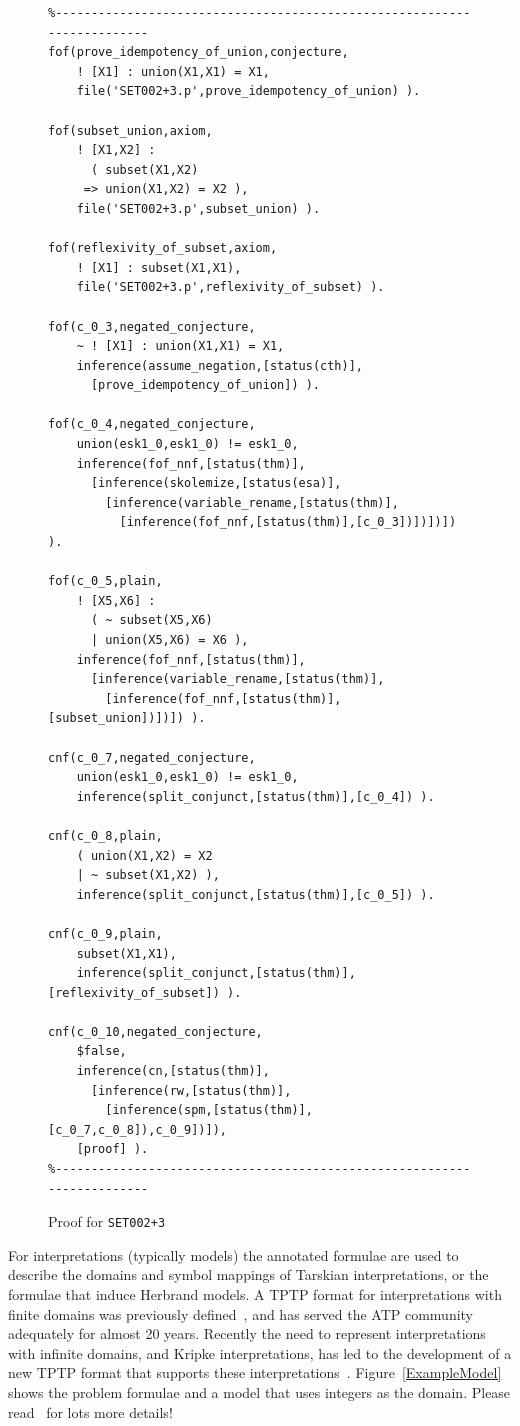 \documentclass[runningheads]{llncs}
\begin{document}
\begin{figure}[h!]
\centering
{\footnotesize
{\setlength{\baselineskip}{3mm}
\begin{verbatim}
%------------------------------------------------------------------------
fof(prove_idempotency_of_union,conjecture,
    ! [X1] : union(X1,X1) = X1,
    file('SET002+3.p',prove_idempotency_of_union) ).

fof(subset_union,axiom,
    ! [X1,X2] :
      ( subset(X1,X2)
     => union(X1,X2) = X2 ),
    file('SET002+3.p',subset_union) ).

fof(reflexivity_of_subset,axiom,
    ! [X1] : subset(X1,X1),
    file('SET002+3.p',reflexivity_of_subset) ).

fof(c_0_3,negated_conjecture,
    ~ ! [X1] : union(X1,X1) = X1,
    inference(assume_negation,[status(cth)],
      [prove_idempotency_of_union]) ).

fof(c_0_4,negated_conjecture,
    union(esk1_0,esk1_0) != esk1_0,
    inference(fof_nnf,[status(thm)],
      [inference(skolemize,[status(esa)],
        [inference(variable_rename,[status(thm)],
          [inference(fof_nnf,[status(thm)],[c_0_3])])])]) ).

fof(c_0_5,plain,
    ! [X5,X6] :
      ( ~ subset(X5,X6)
      | union(X5,X6) = X6 ),
    inference(fof_nnf,[status(thm)],
      [inference(variable_rename,[status(thm)],
        [inference(fof_nnf,[status(thm)],[subset_union])])]) ).

cnf(c_0_7,negated_conjecture,
    union(esk1_0,esk1_0) != esk1_0,
    inference(split_conjunct,[status(thm)],[c_0_4]) ).

cnf(c_0_8,plain,
    ( union(X1,X2) = X2
    | ~ subset(X1,X2) ),
    inference(split_conjunct,[status(thm)],[c_0_5]) ).

cnf(c_0_9,plain,
    subset(X1,X1),
    inference(split_conjunct,[status(thm)],[reflexivity_of_subset]) ).

cnf(c_0_10,negated_conjecture,
    $false,
    inference(cn,[status(thm)],
      [inference(rw,[status(thm)],
        [inference(spm,[status(thm)],[c_0_7,c_0_8]),c_0_9])]),
    [proof] ).
%------------------------------------------------------------------------
\end{verbatim}
}}
\caption{Proof for {\tt SET002+3}}
\label{ExampleDerivationFormulae}
\end{figure}

For interpretations (typically models) the annotated formulae are used to describe the domains
and symbol mappings of Tarskian interpretations, or the formulae that induce Herbrand models.
A TPTP format for interpretations with finite domains was previously defined~\cite{SS+06}, 
and has served the ATP community adequately for almost 20 years. 
Recently the need to represent interpretations with infinite domains, and Kripke interpretations, 
has led to the development of a new TPTP format that supports these interpretations~\cite{SSP24}.
Figure~\ref{ExampleModel} shows the problem formulae and a model that uses integers as the domain.
Please read~\cite{SSP24} for lots more details!
\end{document}
